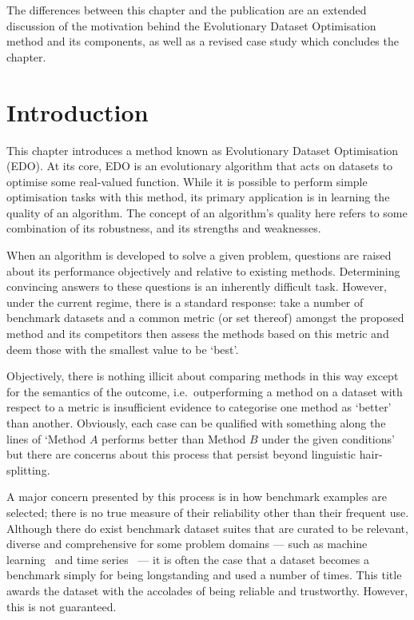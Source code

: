 \myrule%

The differences between this chapter and the publication are an extended
discussion of the motivation behind the Evolutionary Dataset Optimisation method
and its components, as well as a revised case study which concludes the chapter.


\section{Introduction}\label{section:introduction}

This chapter introduces a method known as Evolutionary Dataset Optimisation
(EDO). At its core, EDO is an evolutionary algorithm that acts on datasets to
optimise some real-valued function. While it is possible to perform simple
optimisation tasks with this method, its primary application is in learning the
quality of an algorithm. The concept of an algorithm's quality here refers to
some combination of its robustness, and its strengths and weaknesses.

When an algorithm is developed to solve a given problem, questions are raised
about its performance objectively and relative to existing methods. Determining
convincing answers to these questions is an inherently difficult task. However,
under the current regime, there is a standard response: take a number of
benchmark datasets and a common metric (or set thereof) amongst the proposed
method and its competitors then assess the methods based on this metric and deem
those with the smallest value to be `best'.

Objectively, there is nothing illicit about comparing methods in this way except
for the semantics of the outcome, i.e.\ outperforming a method on a dataset with
respect to a metric is insufficient evidence to categorise one method as
`better' than another. Obviously, each case can be qualified  with something
along the lines of `Method \(A\) performs better than Method \(B\) under the
given conditions' but there are concerns about this process that persist beyond
linguistic hair-splitting. 

A major concern presented by this process is in how benchmark examples are
selected; there is no true measure of their reliability other than their
frequent use. Although there do exist benchmark dataset suites that are curated
to be relevant, diverse and comprehensive for some problem domains --- such as
machine learning~\cite{Dua2019,Olson2017} and time series~\cite{UCRArchive2018}
--- it is often the case that a dataset becomes a benchmark simply for being
longstanding and used a number of times. This title awards the dataset with the
accolades of being reliable and trustworthy. However, this is not guaranteed.


